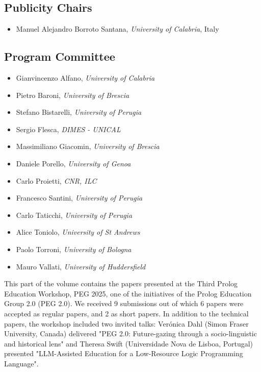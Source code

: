\documentclass[
]{ceurart}
\begin{document}
\subsection*{Publicity Chairs}
\begin{itemize}
  \item Manuel Alejandro Borroto Santana, \emph{University of Calabria}, Italy
\end{itemize}


\subsection*{Program Committee}
\begin{itemize}
  \item Gianvincenzo Alfano, \emph{University of Calabria}
  \item Pietro Baroni, \emph{University of Brescia}
  \item Stefano Bistarelli, \emph{University of Perugia}
  \item Sergio Flesca, \emph{DIMES - UNICAL}
  \item Massimiliano Giacomin, \emph{University of Brescia}
  \item Daniele Porello, \emph{University of Genoa}
  \item Carlo Proietti, \emph{CNR, ILC}
  \item Francesco Santini, \emph{University of Perugia}
  \item Carlo Taticchi, \emph{University of Perugia}
  \item Alice Toniolo, \emph{University of St Andrews}
  \item Paolo Torroni, \emph{University of Bologna}
  \item Mauro Vallati, \emph{University of Huddersfield}
\end{itemize}


\noindent
This part of the volume contains the papers presented at the Third Prolog Education Workshop, PEG 2025, one of the initiatives of the Prolog Education Group 2.0 (PEG 2.0). We received 9 submissions out of which 6 papers were accepted as regular papers, and 2 as short papers. In addition to the technical papers, the workshop included two invited talks: Verónica Dahl (Simon Fraser University, Canada) delivered "PEG 2.0: Future-gazing through a socio-linguistic and historical lens" and Theresa Swift (Universidade Nova de Lisboa, Portugal) presented "LLM-Assisted Education for a Low-Resource Logic Programming Language".
\end{document}
